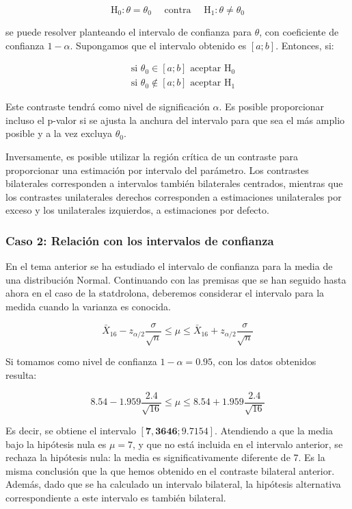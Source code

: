 \documentclass[
]{article}
\begin{document}
\[
\mathrm{H}_{0}: \theta=\theta_{0} \quad \text { contra } \quad \mathrm{H}_{1}: \theta \neq \theta_{0}
\]

se puede resolver planteando el intervalo de confianza para \(\theta\), con coeficiente de confianza \(1-\alpha\). Supongamos que el intervalo obtenido es \([a ; b]\). Entonces, si:

\[
\begin{aligned}
& \text { si } \theta_{0} \in[a ; b] \text { aceptar } \mathrm{H}_{0} \\
& \text { si } \theta_{0} \notin[a ; b] \text { aceptar } \mathrm{H}_{1}
\end{aligned}
\]

Este contraste tendrá como nivel de significación \(\alpha\). Es posible proporcionar incluso el p-valor si se ajusta la anchura del intervalo para que sea el más amplio posible y a la vez excluya \(\theta_{0}\).

Inversamente, es posible utilizar la región crítica de un contraste para proporcionar una estimación por intervalo del parámetro. Los contrastes bilaterales corresponden a intervalos también bilaterales centrados, mientras que los contrastes unilaterales derechos corresponden a estimaciones unilaterales por exceso y los unilaterales izquierdos, a estimaciones por defecto.

\subsubsection{Caso 2: Relación con los intervalos de confianza}\label{caso-2-relaciuxf3n-con-los-intervalos-de-confianza}

En el tema anterior se ha estudiado el intervalo de confianza para la media de una distribución Normal. Continuando con las premisas que se han seguido hasta ahora en el caso de la statdrolona, deberemos considerar el intervalo para la medida cuando la varianza es conocida.

\[
\bar{X}_{16}-z_{\alpha / 2} \frac{\sigma}{\sqrt{n}} \leq \mu \leq \bar{X}_{16}+z_{\alpha / 2} \frac{\sigma}{\sqrt{n}}
\]

Si tomamos como nivel de confianza \(1-\alpha=0.95\), con los datos obtenidos resulta:

\[
8.54-1.959 \frac{2.4}{\sqrt{16}} \leq \mu \leq 8.54+1.959 \frac{2.4}{\sqrt{16}}
\]

Es decir, se obtiene el intervalo \([\mathbf{7 , 3 6 4 6};9.7154]\). Atendiendo a que la media bajo la hipótesis nula es \(\mu=7\), y que no está incluida en el intervalo anterior, se rechaza la hipótesis nula: la media es significativamente diferente de 7. Es la misma conclusión que la que hemos obtenido en el contraste bilateral anterior. Además, dado que se ha calculado un intervalo bilateral, la hipótesis alternativa correspondiente a este intervalo es también bilateral.
\end{document}
